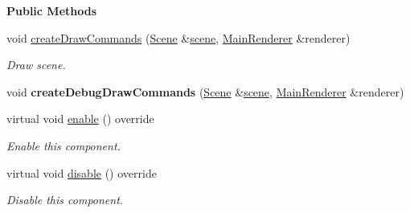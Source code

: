 \begin{Indent}\textbf{ Public Methods}\par
\begin{DoxyCompactItemize}
\item 
\mbox{\label{classrev_1_1_camera_component_a78529bf392900846390200bf520468ab}} 
void \mbox{\hyperlink{classrev_1_1_camera_component_a78529bf392900846390200bf520468ab}{create\+Draw\+Commands}} (\mbox{\hyperlink{classrev_1_1_scene}{Scene}} \&\mbox{\hyperlink{classrev_1_1_component_a76bcbb43342679d7b693eef48546854b}{scene}}, \mbox{\hyperlink{classrev_1_1_main_renderer}{Main\+Renderer}} \&renderer)
\begin{DoxyCompactList}\small\item\em Draw scene. \end{DoxyCompactList}\item 
\mbox{\label{classrev_1_1_camera_component_a8ad67e89410a8e93bf0a98dc485c7409}} 
void {\bfseries create\+Debug\+Draw\+Commands} (\mbox{\hyperlink{classrev_1_1_scene}{Scene}} \&\mbox{\hyperlink{classrev_1_1_component_a76bcbb43342679d7b693eef48546854b}{scene}}, \mbox{\hyperlink{classrev_1_1_main_renderer}{Main\+Renderer}} \&renderer)
\item 
\mbox{\label{classrev_1_1_camera_component_a1c26fe3bcac9257f5690b90f316f6571}} 
virtual void \mbox{\hyperlink{classrev_1_1_camera_component_a1c26fe3bcac9257f5690b90f316f6571}{enable}} () override
\begin{DoxyCompactList}\small\item\em Enable this component. \end{DoxyCompactList}\item 
\mbox{\label{classrev_1_1_camera_component_ac469cca55c2874b4e8fd86c69af1b03d}} 
virtual void \mbox{\hyperlink{classrev_1_1_camera_component_ac469cca55c2874b4e8fd86c69af1b03d}{disable}} () override
\begin{DoxyCompactList}\small\item\em Disable this component. \end{DoxyCompactList}\end{DoxyCompactItemize}
\end{Indent}
